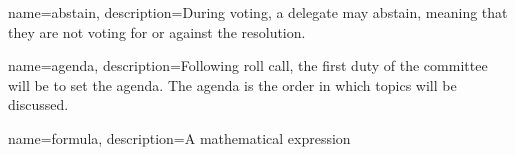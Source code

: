 \makeglossaries

{
        name=abstain,
        description={During voting, a delegate may abstain, meaning that 
they are not voting for or against the resolution.}
}
 
{
        name=agenda,
        description={Following roll call, the first duty of the committee will 
be to set the agenda. The agenda is the order in which topics 
will be discussed.}
}
 
{
        name=formula,
        description={A mathematical expression}
}
 
 
